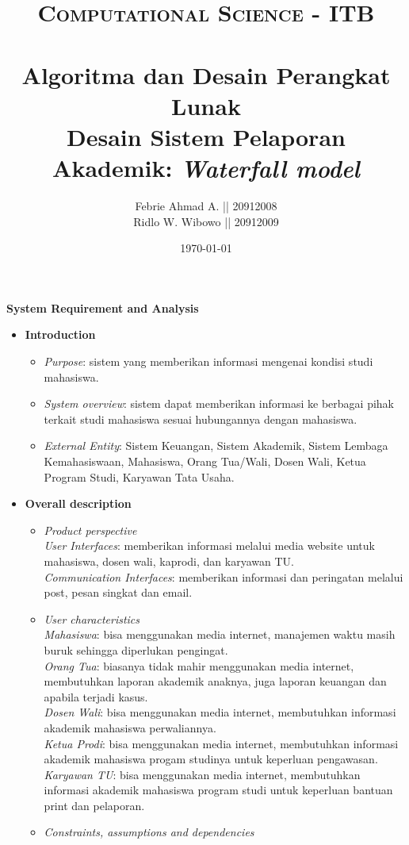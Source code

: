\documentclass[paper=a4, fontsize=11pt]{scrartcl}
\title{	
\normalfont \normalsize 
\textsc{Computational Science - ITB} \\ [25pt] %
\horrule{0.5pt} \\[0.4cm] %
\small Algoritma dan Desain Perangkat Lunak\\
\large Desain Sistem Pelaporan Akademik: \textit{Waterfall model} \\ %
}
\author{\small Febrie Ahmad A. || 20912008 \\ \small Ridlo W. Wibowo || 20912009} %
\date{\normalsize\today} %
\numberwithin{equation}{section} %
\numberwithin{figure}{section} %
\numberwithin{table}{section} %
\begin{document}
\maketitle %

\large \textbf{System Requirement and Analysis}
\begin{itemize}
\item \textbf{Introduction}
	\begin{itemize}
	\item \textit{Purpose}: sistem yang memberikan informasi mengenai kondisi studi mahasiswa.
	\item \textit{System overview}: sistem dapat memberikan informasi ke berbagai pihak terkait studi mahasiswa sesuai hubungannya dengan mahasiswa.
	\item \textit{External Entity}: Sistem Keuangan, Sistem Akademik, Sistem Lembaga Kemahasiswaan, Mahasiswa, Orang Tua/Wali, Dosen Wali, Ketua Program Studi, Karyawan Tata Usaha.
	\end{itemize}
\item \textbf{Overall description}
	\begin{itemize}
	\item \textit{Product perspective}\\
		\textit{User Interfaces}: memberikan informasi melalui media website untuk mahasiswa, dosen wali, kaprodi, dan karyawan TU.\\
		\textit{Communication Interfaces}: memberikan informasi dan peringatan melalui post, pesan singkat dan email.
	\item \textit{User characteristics}\\
		\textit{Mahasiswa}: bisa menggunakan media internet, manajemen waktu masih buruk sehingga diperlukan pengingat.\\
		\textit{Orang Tua}: biasanya tidak mahir menggunakan media internet, membutuhkan laporan akademik anaknya, juga laporan keuangan dan apabila terjadi kasus.\\
		\textit{Dosen Wali}: bisa menggunakan media internet, membutuhkan informasi akademik mahasiswa perwaliannya.\\
		\textit{Ketua Prodi}: bisa menggunakan media internet, membutuhkan informasi akademik mahasiswa progam studinya untuk keperluan pengawasan.\\
		\textit{Karyawan TU}: bisa menggunakan media internet, membutuhkan informasi akademik mahasiswa program studi untuk keperluan bantuan print dan pelaporan.\\
	\item \textit{Constraints, assumptions and dependencies}\\

\end{itemize}
\end{itemize}
\end{document}
